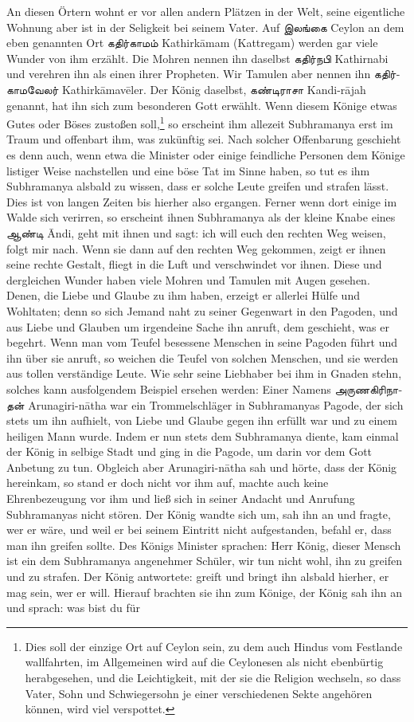 \documentclass{article}
\newcommand{\TamilText}[1]{\texttamil{#1}}
\newcommand{\tam}[1]{\TamilText{#1}}
\begin{document}
An diesen Örtern wohnt er vor allen andern Plätzen in der Welt, seine eigentliche Wohnung aber ist in der Seligkeit bei seinem Vater. Auf \tam{இலங்கை} Ceylon an dem eben genannten Ort \tam{கதிர்காமம்} Kathirk\={a}mam (Kattregam) werden gar viele Wunder von ihm erzählt. Die Mohren nennen ihn daselbst \tam{கதிர்நபி} Kathirnabi und verehren ihn als einen ihrer Propheten. Wir Tamulen aber nennen ihn \tam{கதிர்காமவேலர்} Kathirk\={a}mav\={e}ler. Der König daselbst, \tam{கண்டிராசா} Kandi-r\={a}jah genannt, hat ihn sich zum besonderen Gott erwählt. Wenn diesem Könige etwas Gutes oder Böses zustoßen soll,\footnote{Dies soll der einzige Ort auf Ceylon sein, zu dem auch Hindus vom Festlande wallfahrten, im Allgemeinen wird auf die Ceylonesen als nicht ebenbürtig herabgesehen, und die Leichtigkeit, mit der sie die Religion wechseln, so dass Vater, Sohn und Schwiegersohn je einer verschiedenen Sekte angehören können, wird viel verspottet.} so erscheint ihm allezeit Subhramanya erst im Traum und offenbart ihm, was zukünftig sei. Nach solcher Offenbarung geschieht es denn auch, wenn etwa die Minister oder einige feindliche Personen dem Könige listiger Weise nachstellen und eine böse Tat im Sinne haben, so tut es ihm Subhramanya alsbald zu wissen, dass er solche Leute greifen und strafen lässt. Dies ist von langen Zeiten bis hierher also ergangen. Ferner wenn dort einige im Walde sich verirren, so erscheint ihnen Subhramanya als der kleine Knabe eines \tam{ஆண்டி} \={A}ndi, geht mit ihnen und sagt: ich will euch den rechten Weg weisen, folgt mir nach. Wenn sie dann auf den rechten Weg gekommen, zeigt er ihnen seine rechte Gestalt, fliegt in die Luft und verschwindet vor ihnen. Diese und dergleichen Wunder haben viele Mohren und Tamulen mit Augen gesehen. Denen, die Liebe und Glaube zu ihm haben, erzeigt er allerlei Hülfe und Wohltaten; denn so sich Jemand naht zu seiner Gegenwart in den Pagoden, und aus Liebe und Glauben um irgendeine Sache ihn anruft, dem geschieht, was er begehrt. Wenn man vom Teufel besessene Menschen in seine Pagoden führt und ihn über sie anruft, so weichen die Teufel von solchen Menschen, und sie werden aus tollen verständige Leute. Wie sehr seine Liebhaber bei ihm in Gnaden stehn, solches kann ausfolgendem Beispiel ersehen werden: Einer Namens \tam{அருணகிரிநாதன்} Arunagiri-n\={a}tha war ein Trommelschläger in Subhramanyas Pagode, der sich stets um ihn aufhielt, von Liebe und Glaube gegen ihn erfüllt war und zu einem heiligen Mann wurde. Indem er nun stets dem Subhramanya diente, kam einmal der König in selbige Stadt und ging in die Pagode, um darin vor dem Gott Anbetung zu tun. Obgleich aber Arunagiri-n\={a}tha sah und hörte, dass der König hereinkam, so stand er doch nicht vor ihm auf, machte auch keine Ehrenbezeugung vor ihm und ließ sich in seiner Andacht und Anrufung Subhramanyas nicht stören. Der König wandte sich um, sah ihn an und fragte, wer er wäre, und weil er bei seinem Eintritt nicht aufgestanden, befahl er, dass man ihn greifen sollte. Des Königs Minister sprachen: Herr König, dieser Mensch ist ein dem Subhramanya angenehmer Schüler, wir tun nicht wohl, ihn zu greifen und zu strafen. Der König antwortete: greift und bringt ihn alsbald hierher, er mag sein, wer er will. Hierauf brachten sie ihn zum Könige, der König sah ihn an und sprach: was bist du für 
\end{document}

